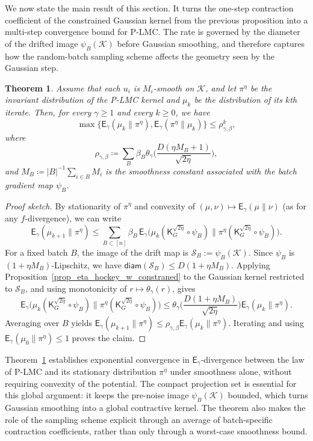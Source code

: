\documentclass[10pt, journal]{IEEEtran}
\newtheorem{theorem}{Theorem}
\begin{document}
We now state the main result of this section. It turns the one-step contraction coefficient of the constrained Gaussian kernel from the previous proposition into a multi-step convergence bound for P-LMC. The rate is governed by the diameter of the drifted image $\psi_B(\mathcal K)$ before Gaussian smoothing, and therefore captures how the random-batch sampling scheme affects the geometry seen by the Gaussian step.

\begin{theorem}\label{thm:avg-egamma-general}
Assume that each $u_i$ is $M_i$-smooth on $\mathcal K$, and let $\pi^\eta$ be the invariant distribution of the P-LMC kernel and $\mu_k$ be the distribution of its $k$th iterate. Then,  
for every $\gamma\ge 1$ and every $k\ge 0$, we have 
$$\max\{\mathsf{E}_\gamma(\mu_{k} \| \pi^\eta), \mathsf{E}_\gamma(\pi^\eta\| \mu_{k})\}  \le \rho^k_{\gamma,\beta},$$
where 
$$\rho_{\gamma,\beta} \coloneqq \sum_{B} \beta_B \theta_{\gamma}\Big(\frac{D(\eta M_B + 1)}{\sqrt{2\eta}}\Big),$$
and $M_B\coloneqq |B|^{-1}\sum_{i\in B}M_i$ is the smoothness constant associated with the batch gradient map $\psi_B$.
\end{theorem}
\begin{proof}[Proof sketch]
By stationarity of $\pi^\eta$ and convexity of $(\mu,\nu)\mapsto\mathsf E_\gamma(\mu\|\nu)$ (as for any $f$-divergence), we can write 
$$\mathsf E_\gamma(\mu_{k+1}\|\pi^\eta)\le \sum_{B\subset [n]}\beta_B\,\mathsf E_\gamma\big(\mu_k(\mathsf K_G^{\sqrt{2\eta}}\circ\psi_B)\|\pi^\eta(\mathsf K_G^{\sqrt{2\eta}}\circ\psi_B)\big).$$
For a fixed batch $B$, the image of the drift map is $\mathcal S_B:=\psi_B(\mathcal K)$. Since $\psi_B$ is $(1+\eta M_B)$-Lipschitz, we have   
$\mathsf{diam}(\mathcal S_B)\le D(1+\eta M_B).$
Applying Proposition~\ref{prop_eta_hockey_w_constraned} to the Gaussian kernel restricted to $\mathcal S_B$, and using monotonicity of $r\mapsto\theta_\gamma(r)$, gives
$$\mathsf E_\gamma\big(\mu_k(\mathsf K_G^{\sqrt{2\eta}}\circ\psi_B)\|\pi^\eta(\mathsf K_G^{\sqrt{2\eta}}\circ\psi_B)\big)\le \theta_\gamma\Big(\frac{D(1+\eta M_B)}{\sqrt{2\eta}}\Big)\mathsf E_\gamma(\mu_k\|\pi^\eta).$$
Averaging over $B$ yields $\mathsf E_\gamma(\mu_{k+1}\|\pi^\eta)\le\rho_{\gamma,\beta}\mathsf E_\gamma(\mu_k\|\pi^\eta)$. Iterating and using $\mathsf E_\gamma(\mu_0\|\pi^\eta)\le 1$ proves the claim.
\end{proof}
Theorem~\ref{thm:avg-egamma-general} establishes exponential convergence in $\mathsf E_\gamma$-divergence between the law of P-LMC and its stationary distribution $\pi^\eta$ under smoothness alone, without requiring convexity of the potential. The compact projection set is essential for this global argument: it keeps the pre-noise image $\psi_B(\mathcal K)$ bounded, which turns Gaussian smoothing into a global contractive kernel. The theorem also makes the role of the sampling scheme explicit through an average of batch-specific contraction coefficients, rather than only through a worst-case smoothness bound.
\end{document}
